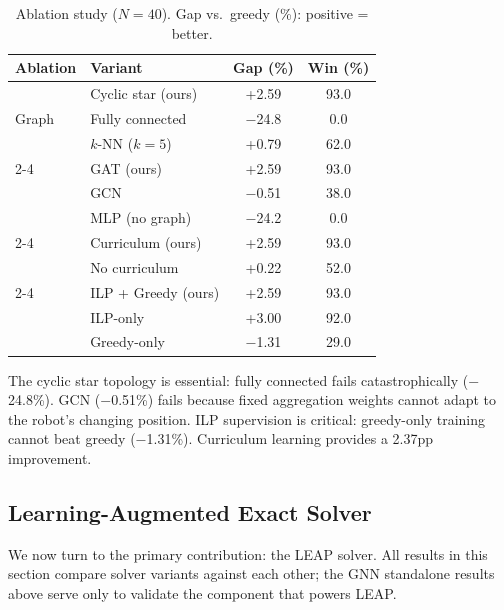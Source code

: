\documentclass[conference]{IEEEtran}
\begin{document}
\begin{table}[htbp]
\caption{Ablation study ($N{=}40$). Gap vs.\ greedy (\%): positive = better.}
\label{tab:ablations}
\centering
\begin{tabular}{@{}llcc@{}}
\toprule
\textbf{Ablation} & \textbf{Variant} & \textbf{Gap (\%)} & \textbf{Win (\%)} \\
\midrule
\multirow{3}{*}{Graph}
    & Cyclic star (ours) & +2.59 & 93.0 \\
    & Fully connected & $-$24.8 & 0.0 \\
    & $k$-NN ($k{=}5$) & +0.79 & 62.0 \\
\cmidrule(l){2-4}
\multirow{3}{*}{Encoder}
    & GAT (ours) & +2.59 & 93.0 \\
    & GCN & $-$0.51 & 38.0 \\
    & MLP (no graph) & $-$24.2 & 0.0 \\
\cmidrule(l){2-4}
\multirow{2}{*}{Curriculum}
    & Curriculum (ours) & +2.59 & 93.0 \\
    & No curriculum & +0.22 & 52.0 \\
\cmidrule(l){2-4}
\multirow{3}{*}{Supervision}
    & ILP + Greedy (ours) & +2.59 & 93.0 \\
    & ILP-only & +3.00 & 92.0 \\
    & Greedy-only & $-$1.31 & 29.0 \\
\bottomrule
\end{tabular}
\end{table}

The cyclic star topology is essential: fully connected fails catastrophically ($-$24.8\%). GCN ($-$0.51\%) fails because fixed aggregation weights cannot adapt to the robot's changing position. ILP supervision is critical: greedy-only training cannot beat greedy ($-$1.31\%). Curriculum learning provides a 2.37pp improvement.

\subsection{Learning-Augmented Exact Solver}\label{sec:hybrid_eval}

We now turn to the primary contribution: the LEAP solver. All results in this section compare solver variants against each other; the GNN standalone results above serve only to validate the component that powers LEAP.
\end{document}
